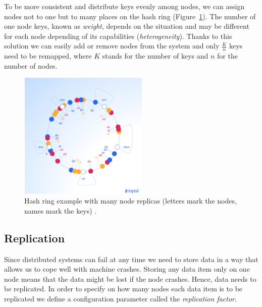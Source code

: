         To be more consistent and distribute keys evenly among nodes, we can assign nodes not to one but to many places on the hash ring (Figure~\ref{ConsistentHashingImage2}).
        The number of one node keys, known as \textit{weight}, depends on the situation and may be different for each node depending of its capabilities (\textit{heterogeneity}). 
        Thanks to this solution we can easily add or remove nodes from the system and only $\frac{K}{n}$ keys need to be remapped, where $K$ stands for the number of keys and $n$ for the number of nodes.
        
        \begin{figure}[ht]
            \centering
                \includegraphics[width=0.55\textwidth]{thesis/figures/vnodes.png}
            \caption{Hash ring example with many node replicas (letters mark the nodes, names mark the keys) \cite{ConsistentHashing}.}
            \label{ConsistentHashingImage2}
        \end{figure}
        
    \subsection{Replication}
    \label{replication}
        Since distributed systems can fail at any time we need to store data in a way that allows us to cope well with machine crashes. Storing any data item only on one node means that the data might be lost if the node crashes. Hence, data needs to be replicated. In order to specify on how many nodes each data item is to be replicated we define a configuration parameter called the \textit{replication factor}. 
        
